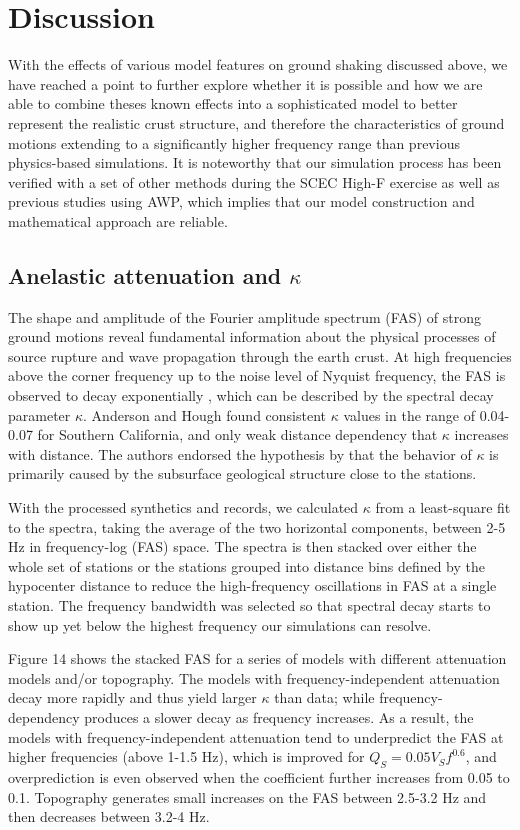 \section{Discussion}
With the effects of various model features on ground shaking discussed above, we have reached a point to further explore whether it is possible and how we are able to combine theses known effects into a sophisticated model to better represent the realistic crust structure, and therefore the characteristics of ground motions extending to a significantly higher frequency range than previous  physics-based simulations. It is noteworthy that our simulation process has been verified with a set of other methods during  the SCEC High-F exercise as well as previous studies using AWP, which implies that our model construction and mathematical approach are reliable.

\subsection{Anelastic attenuation and $\kappa$}
The shape and amplitude of the Fourier amplitude spectrum (FAS) of strong ground motions reveal fundamental information about the physical processes of source rupture and wave propagation through the earth crust. At high frequencies above the corner frequency up to the noise level of Nyquist frequency, the FAS is observed to decay exponentially \citep{anderson1984model}, which can be described by the spectral decay parameter $\kappa$. Anderson and Hough found consistent $\kappa$ values in the range of 0.04-0.07 for Southern California, and only weak distance dependency that $\kappa$ increases with distance. The authors endorsed the hypothesis by \citet{hanksFmax1982} that the behavior of $\kappa$ is primarily caused by the subsurface geological structure close to the stations.

With the processed synthetics and records, we calculated $\kappa$ from a least-square fit to the spectra, taking the average of the two horizontal components, between 2-5 Hz in frequency-log (FAS) space. The spectra is then stacked over either the whole set of stations or the stations grouped into distance bins defined by the hypocenter distance to reduce the high-frequency oscillations in FAS at a single station. The frequency bandwidth was selected so that spectral decay starts to show up yet below the highest frequency our simulations can resolve.

Figure 14 shows the stacked FAS for a series of models with different attenuation models and/or topography. The models with frequency-independent attenuation decay more rapidly and thus yield larger $\kappa$ than data; while frequency-dependency produces a slower decay as frequency increases. As a result, the models with frequency-independent attenuation tend to underpredict the FAS at higher frequencies (above 1-1.5 Hz), which is improved for $Q_S=0.05V_Sf^{0.6}$, and overprediction is even observed when the coefficient further increases from 0.05 to 0.1. Topography generates small increases on the FAS between 2.5-3.2 Hz and then decreases between 3.2-4 Hz.

